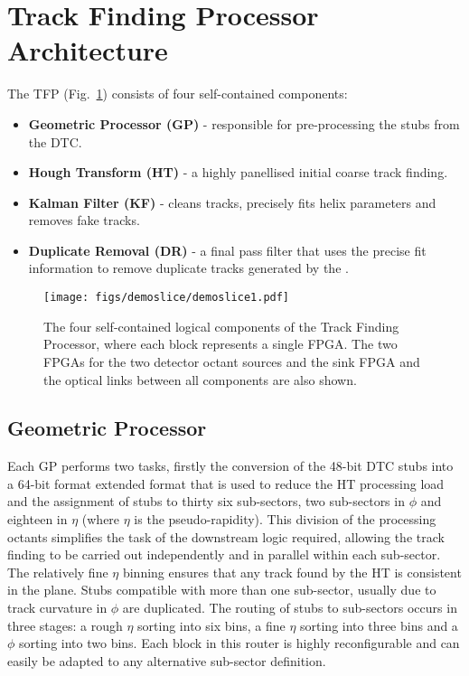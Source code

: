 \section{Track Finding Processor Architecture}\label{sec:tf-arch}
The TFP (Fig.~\ref{fig:TFP}) consists of four self-contained components:
\begin{itemize}
\item {\bf Geometric Processor (GP)} - responsible for pre-processing the stubs from the DTC.
\item {\bf Hough Transform (HT)} - a highly panellised initial coarse track finding.
\item {\bf Kalman Filter (KF)} - cleans tracks, precisely fits helix parameters and removes fake tracks.
\item {\bf Duplicate Removal (DR)} - a final pass filter that uses the precise fit information to remove duplicate tracks generated by the \HT.
\end{itemize}

\begin{figure}[!h]
\centering
\texttt{[image: figs/demoslice/demoslice1.pdf]}
\caption{The four self-contained logical components of the Track Finding Processor, where each block represents a single FPGA. The two FPGAs for the two detector octant sources and the sink FPGA and the optical links between all components are also shown.}
\label{fig:TFP}
\end{figure}

\subsection{Geometric Processor}
Each GP performs two tasks, firstly the conversion of the 48-bit DTC stubs into a 64-bit format extended format that is used to reduce the HT processing load and the assignment of stubs to thirty six sub-sectors, two sub-sectors in $\phi$ and eighteen in $\eta$ (where $\eta$ is the pseudo-rapidity). This division of the processing octants simplifies the task of the downstream logic required, allowing the track finding to be carried out independently and in parallel within each sub-sector. The relatively fine $\eta$ binning ensures that any track found by the \rphi HT is consistent in the \rz plane. Stubs compatible with more than one sub-sector, usually due to track curvature in $\phi$ are duplicated. The routing of stubs to sub-sectors occurs in three stages: a rough $\eta$ sorting into six bins, a fine $\eta$ sorting into three bins and a $\phi$ sorting into two bins. Each block in this router is highly reconfigurable and can easily be adapted to any alternative sub-sector definition.

